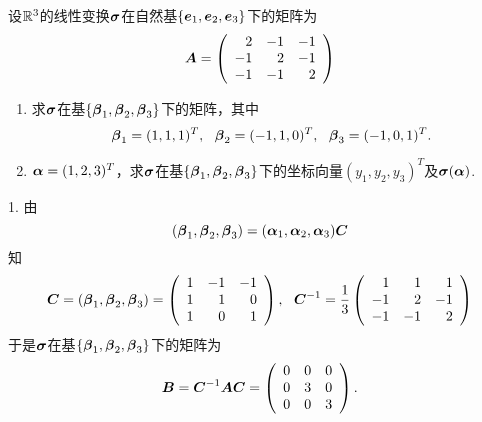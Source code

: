 \begin{frame}
  \begin{li}
    设$\mathbb R^3$的线性变换$\boldsymbol{\sigma}$在自然基$\{{\boldsymbol{e}}_1,{\boldsymbol{e}}_2,{\boldsymbol{e}}_3\}$下的矩阵为
    $$
    \boldsymbol{A}=\left(
      \begin{array}{rrr}
        2&-1&-1\\
        -1&2&-1\\
        -1&-1&2
      \end{array}
    \right)
    $$
    \begin{enumerate}
    \item 求$\boldsymbol{\sigma}$在基$\{\boldsymbol{\beta}_1,\boldsymbol{\beta}_2,\boldsymbol{\beta}_3\}$下的矩阵，其中
      $$
      \boldsymbol{\beta}_1=(1,1,1)^T, ~~\boldsymbol{\beta}_2=(-1,1,0)^T, ~~\boldsymbol{\beta}_3=(-1,0,1)^T.
      $$
    \item $\boldsymbol{\alpha}=(1,2,3)^T$，求$\boldsymbol{\sigma}$在基$\{\boldsymbol{\beta}_1,\boldsymbol{\beta}_2,\boldsymbol{\beta}_3\}$下的坐标向量$(y_1,y_2,y_3)^T$及$\boldsymbol{\sigma}(\boldsymbol{\alpha})$.
    \end{enumerate}
  \end{li}
\end{frame}


\begin{frame}
  \begin{jie}
    1. 由
    $$
    (\boldsymbol{\beta}_1,\boldsymbol{\beta}_2,\boldsymbol{\beta}_3)=(\boldsymbol{\alpha}_1,\boldsymbol{\alpha}_2,\boldsymbol{\alpha}_3)\boldsymbol{C}
    $$
    知
    $$
    \boldsymbol{C}=(\boldsymbol{\beta}_1,\boldsymbol{\beta}_2,\boldsymbol{\beta}_3)=\left(
      \begin{array}{rrr}
        1&-1&-1\\
        1&1&0\\
        1&0&1
      \end{array}
    \right), ~~ 
    \boldsymbol{C}^{-1}=\frac13\left(
      \begin{array}{rrr}
        1&1&1\\
        -1&2&-1\\
        -1&-1&2
      \end{array}
    \right)
    $$
    于是$\boldsymbol{\sigma}$在基$\{\boldsymbol{\beta}_1,\boldsymbol{\beta}_2,\boldsymbol{\beta}_3\}$下的矩阵为
    $$
    \boldsymbol{B}=\boldsymbol{C}^{-1}\boldsymbol{A}\boldsymbol{C}=
    \left(
      \begin{array}{rrr}
        0&0&0\\
        0&3&0\\
        0&0&3
      \end{array}
    \right).
    $$
  \end{jie}
\end{frame}


